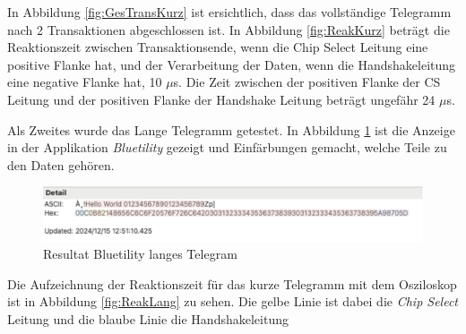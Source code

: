 In Abbildung \ref{fig:GesTransKurz} ist ersichtlich, dass das vollständige Telegramm nach 2 Transaktionen abgeschlossen ist. In Abbildung \ref{fig:ReakKurz} beträgt die Reaktionszeit zwischen Transaktionsende, wenn die Chip Select Leitung eine positive Flanke hat, und der Verarbeitung der Daten, wenn die Handshakeleitung eine negative Flanke hat, 10 $\mu$s. Die Zeit zwischen der positiven Flanke der CS Leitung und der positiven Flanke der Handshake Leitung beträgt ungefähr 24 $\mu$s.


Als Zweites wurde das Lange Telegramm getestet. In Abbildung \ref{fig:ResultatBLELang} ist die Anzeige in der Applikation \textit{Bluetility} gezeigt und Einfärbungen gemacht, welche Teile zu den Daten gehören.

\begin{figure}[H]
    \centering
    \includegraphics[width=0.9\linewidth]{Figures/Chap4/ESP32/Resultat_BLE_lang.png}
    \caption{Resultat Bluetility langes Telegram}
    \label{fig:ResultatBLELang}
\end{figure}

Die Aufzeichnung der Reaktionszeit für das kurze Telegramm mit dem Osziloskop ist in Abbildung \ref{fig:ReakLang} zu sehen. Die gelbe Linie ist dabei die \textit{Chip Select} Leitung und die blaube Linie die Handshakeleitung 

